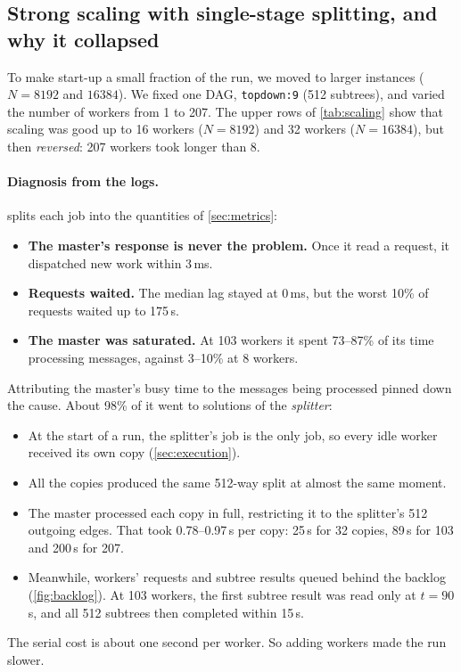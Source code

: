 \documentclass[11pt,a4paper]{article}
\newcommand{\dfam}[1]{\texttt{#1}}
\begin{document}
\subsection{Strong scaling with single-stage splitting, and why it collapsed}
\label{sec:dup}
To make start-up a small fraction of the run, we moved to larger instances ($N=8192$ and
$16384$). We fixed one DAG, \dfam{topdown:9} (512 subtrees), and varied the number of
workers from 1 to 207. The upper rows of \cref{tab:scaling} show that scaling was good up
to 16 workers ($N=8192$) and 32 workers ($N=16384$), but then \emph{reversed}: 207 workers
took longer than 8.

\paragraph{Diagnosis from the logs.}
 splits each job into the quantities of \cref{sec:metrics}:
\begin{itemize}
\item \textbf{The master's response is never the problem.} Once it read a request, it
      dispatched new work within 3\,ms.
\item \textbf{Requests waited.} The median lag stayed at 0\,ms, but the worst 10\% of
      requests waited up to 175\,s.
\item \textbf{The master was saturated.} At 103 workers it spent 73--87\% of its time
      processing messages, against 3--10\% at 8 workers.
\end{itemize}
Attributing the master's busy time to the messages being processed pinned down the cause.
About 98\% of it went to solutions of the \emph{splitter}:
\begin{itemize}
\item At the start of a run, the splitter's job is the only job, so every idle worker
      received its own copy (\cref{sec:execution}).
\item All the copies produced the same 512-way split at almost the same moment.
\item The master processed each copy in full, restricting it to the splitter's 512
      outgoing edges. That took 0.78--0.97\,s per copy: 25\,s for 32 copies, 89\,s for 103
      and 200\,s for 207.
\item Meanwhile, workers' requests and subtree results queued behind the backlog
      (\cref{fig:backlog}). At 103 workers, the first subtree result was read only at
      $t=90$\,s, and all 512 subtrees then completed within 15\,s.
\end{itemize}
The serial cost is about one second per worker. So adding workers made the run slower.
\end{document}
